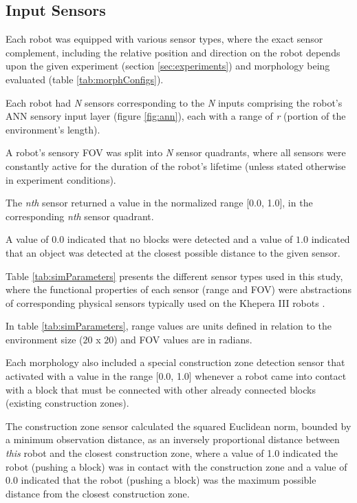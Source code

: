 \subsection{Input Sensors}

Each robot was equipped with various sensor types, where the exact sensor complement, including the
relative position and direction on the robot depends upon the given experiment
(section \ref{sec:experiments}) and morphology being evaluated (table \ref{tab:morphConfigs}).

Each robot had \textit{N} sensors corresponding to the \textit{N} inputs comprising the robot's
ANN sensory input layer (figure \ref{fig:ann}), each with a range of \textit{r}
(portion of the environment's length).

A robot's sensory FOV was split into \textit{N} sensor quadrants, where all sensors were constantly active
for the duration of the robot's lifetime (unless stated otherwise in experiment conditions).

The \textit{nth} sensor returned a value in the normalized range [0.0, 1.0],
in the corresponding \textit{nth} sensor quadrant.

A value of $0.0$ indicated that no blocks were detected and a value of $1.0$ indicated that an object was detected
at the closest possible distance to the given sensor.

Table \ref{tab:simParameters} presents the different sensor types used in this study, where the functional properties of each sensor
(range and FOV) were abstractions of corresponding physical sensors typically used on the Khepera III robots \cite{khepera3usermanual2013}.

In table \ref{tab:simParameters}, range values are units defined in relation to the environment size ($20$ x $20$)
and FOV values are in radians.

Each morphology also included a special construction zone detection sensor that activated with a value in the range
[0.0, 1.0] whenever a robot came into
contact with a block that must be connected with other already connected blocks (existing construction zones).

The construction zone sensor calculated the squared Euclidean norm, bounded by a minimum observation distance, as an
inversely proportional distance between \textit{this} robot and the closest construction zone, where a value of 1.0 indicated the robot (pushing a block)
was in contact with the construction zone and a value of 0.0 indicated that the robot (pushing a block) was the maximum possible
distance from the closest construction zone.

